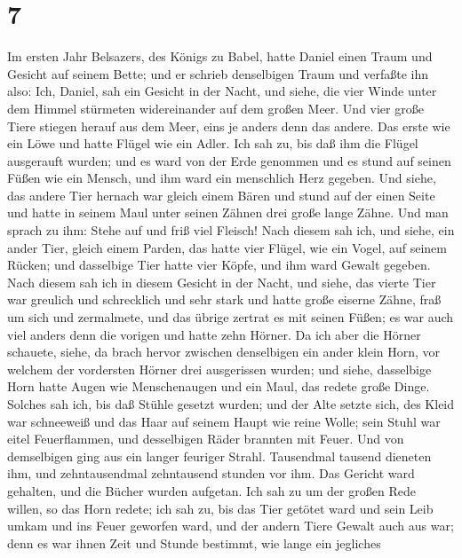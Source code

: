 \hypertarget{section-6}{%
\section{7}\label{section-6}}

 Im ersten Jahr Belsazers, des Königs zu Babel, hatte Daniel
einen Traum und Gesicht auf seinem Bette; und er schrieb denselbigen
Traum und verfaßte ihn also:  Ich, Daniel, sah ein Gesicht
in der Nacht, und siehe, die vier Winde unter dem Himmel stürmeten
widereinander auf dem großen Meer.  Und vier große Tiere
stiegen herauf aus dem Meer, eins je anders denn das andere.
 Das erste wie ein Löwe und hatte Flügel wie ein Adler. Ich
sah zu, bis daß ihm die Flügel ausgerauft wurden; und es ward von der
Erde genommen und es stund auf seinen Füßen wie ein Mensch, und ihm ward
ein menschlich Herz gegeben.  Und siehe, das andere Tier
hernach war gleich einem Bären und stund auf der einen Seite und hatte
in seinem Maul unter seinen Zähnen drei große lange Zähne. Und man
sprach zu ihm: Stehe auf und friß viel Fleisch!  Nach diesem
sah ich, und siehe, ein ander Tier, gleich einem Parden, das hatte vier
Flügel, wie ein Vogel, auf seinem Rücken; und dasselbige Tier hatte vier
Köpfe, und ihm ward Gewalt gegeben.  Nach diesem sah ich in
diesem Gesicht in der Nacht, und siehe, das vierte Tier war greulich und
schrecklich und sehr stark und hatte große eiserne Zähne, fraß um sich
und zermalmete, und das übrige zertrat es mit seinen Füßen; es war auch
viel anders denn die vorigen und hatte zehn Hörner.  Da ich
aber die Hörner schauete, siehe, da brach hervor zwischen denselbigen
ein ander klein Horn, vor welchem der vordersten Hörner drei ausgerissen
wurden; und siehe, dasselbige Horn hatte Augen wie Menschenaugen und ein
Maul, das redete große Dinge.  Solches sah ich, bis daß
Stühle gesetzt wurden; und der Alte setzte sich, des Kleid war
schneeweiß und das Haar auf seinem Haupt wie reine Wolle; sein Stuhl war
eitel Feuerflammen, und desselbigen Räder brannten mit Feuer.
 Und von demselbigen ging aus ein langer feuriger Strahl.
Tausendmal tausend dieneten ihm, und zehntausendmal zehntausend stunden
vor ihm. Das Gericht ward gehalten, und die Bücher wurden aufgetan.
 Ich sah zu um der großen Rede willen, so das Horn redete;
ich sah zu, bis das Tier getötet ward und sein Leib umkam und ins Feuer
geworfen ward,  und der andern Tiere Gewalt auch aus war;
denn es war ihnen Zeit und Stunde bestimmt, wie lange ein jegliches
